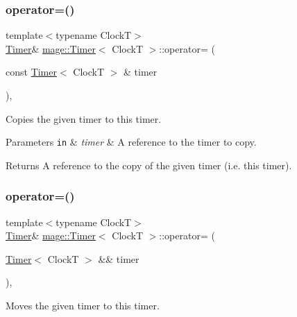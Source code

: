 \subsubsection{\texorpdfstring{operator=()}{operator=()}\hspace{0.1cm}{\footnotesize\ttfamily [1/2]}}
{\footnotesize\ttfamily template$<$typename ClockT$>$ \\
\hyperlink{classmage_1_1_timer}{Timer}\& \hyperlink{classmage_1_1_timer}{mage\+::\+Timer}$<$ ClockT $>$\+::operator= (\begin{DoxyParamCaption}\item[{const \hyperlink{classmage_1_1_timer}{Timer}$<$ ClockT $>$ \&}]{timer }\end{DoxyParamCaption})\hspace{0.3cm}{\ttfamily [default]}, {\ttfamily [noexcept]}}

Copies the given timer to this timer.


\begin{DoxyParams}[1]{Parameters}
\mbox{\tt in}  & {\em timer} & A reference to the timer to copy. \\
\hline
\end{DoxyParams}
\begin{DoxyReturn}{Returns}
A reference to the copy of the given timer (i.\+e. this timer). 
\end{DoxyReturn}
\hypertarget{classmage_1_1_timer_a39654f81efccc38a4cbe6164659407dd}{}\label{classmage_1_1_timer_a39654f81efccc38a4cbe6164659407dd} 
\subsubsection{\texorpdfstring{operator=()}{operator=()}\hspace{0.1cm}{\footnotesize\ttfamily [2/2]}}
{\footnotesize\ttfamily template$<$typename ClockT$>$ \\
\hyperlink{classmage_1_1_timer}{Timer}\& \hyperlink{classmage_1_1_timer}{mage\+::\+Timer}$<$ ClockT $>$\+::operator= (\begin{DoxyParamCaption}\item[{\hyperlink{classmage_1_1_timer}{Timer}$<$ ClockT $>$ \&\&}]{timer }\end{DoxyParamCaption})\hspace{0.3cm}{\ttfamily [default]}, {\ttfamily [noexcept]}}

Moves the given timer to this timer.


